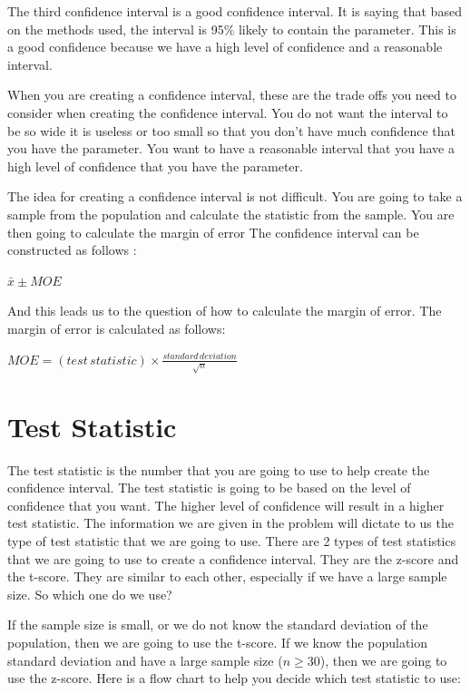 \documentclass[
  letterpaper,
  DIV=11,
  numbers=noendperiod]{scrreprt}
\begin{document}
The third confidence interval is a good confidence interval. It is
saying that based on the methods used, the interval is 95\% likely to
contain the parameter. This is a good confidence because we have a high
level of confidence and a reasonable interval.

When you are creating a confidence interval, these are the trade offs
you need to consider when creating the confidence interval. You do not
want the interval to be so wide it is useless or too small so that you
don't have much confidence that you have the parameter. You want to have
a reasonable interval that you have a high level of confidence that you
have the parameter.

The idea for creating a confidence interval is not difficult. You are
going to take a sample from the population and calculate the statistic
from the sample. You are then going to calculate the margin of error The
confidence interval can be constructed as follows :

\(\bar{x} \pm MOE\)

And this leads us to the question of how to calculate the margin of
error. The margin of error is calculated as follows:

\(\displaystyle{MOE = (test\,statistic) \times \frac{standard\,deviation}{\sqrt{n}}}\)

\section*{Test Statistic}\label{test-statistic}


The test statistic is the number that you are going to use to help
create the confidence interval. The test statistic is going to be based
on the level of confidence that you want. The higher level of confidence
will result in a higher test statistic. The information we are given in
the problem will dictate to us the type of test statistic that we are
going to use. There are 2 types of test statistics that we are going to
use to create a confidence interval. They are the z-score and the
t-score. They are similar to each other, especially if we have a large
sample size. So which one do we use?

If the sample size is small, or we do not know the standard deviation of
the population, then we are going to use the t-score. If we know the
population standard deviation and have a large sample size
(\(n \geq 30\)), then we are going to use the z-score. Here is a flow
chart to help you decide which test statistic to use:
\end{document}
